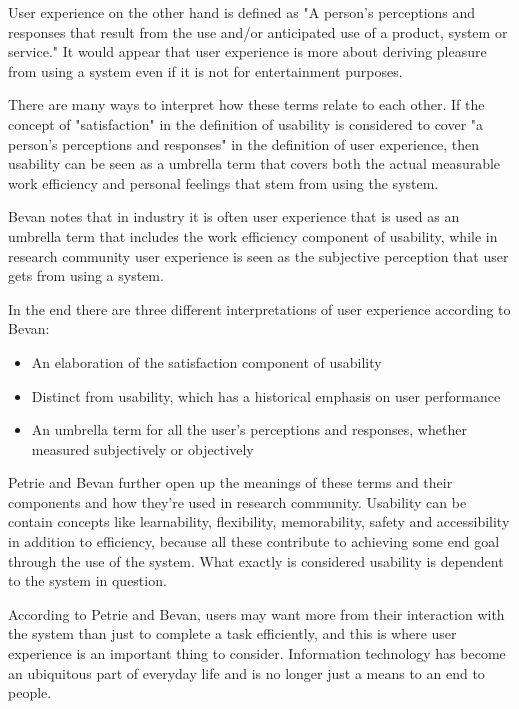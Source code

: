 User experience on the other hand is defined as "A person's perceptions and responses that result from the use and/or anticipated use of a product, system or service." It would appear that user experience is more about deriving pleasure from using a system even if it is not for entertainment purposes.

There are many ways to interpret how these terms relate to each other. If the concept of "satisfaction" in the definition of usability is considered to cover "a person's perceptions and responses" in the definition of user experience, then usability can be seen as a umbrella term that covers both the actual measurable work efficiency and personal feelings that stem from using the system.

Bevan notes that in industry it is often user experience that is used as an umbrella term that includes the work efficiency component of usability, while in research community user experience is seen as the subjective perception that user gets from using a system.

In the end there are three different interpretations of user experience according to Bevan: \begin{itemize}
\item An  elaboration  of  the  satisfaction  component  of usability
\item Distinct  from  usability,  which  has  a  historical emphasis on user performance
\item An  umbrella  term  for  all  the  user’s  perceptions  and responses,  whether  measured  subjectively  or objectively
\end{itemize}
\cite{bevan2009difference}

Petrie and Bevan further open up the meanings of these terms and their components and how they're used in research community. Usability can be contain concepts like learnability, flexibility, memorability, safety and accessibility in addition to efficiency, because all these contribute to achieving some end goal through the use of the system. What exactly is considered usability is dependent to the system in question. 

According to Petrie and Bevan, users may want more from their interaction with the system than just to complete a task efficiently, and this is where user experience is an important thing to consider. Information technology has become an ubiquitous part of everyday life and is no longer just a means to an end to people.
\cite{bevanevaluation}

